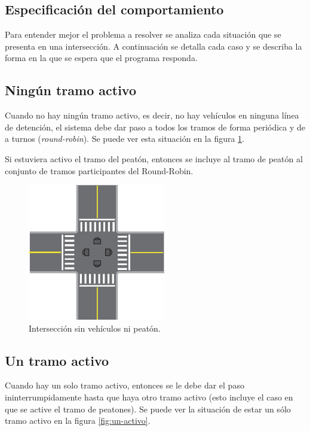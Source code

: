	\subsection{Especificación del comportamiento}\label{sec:spec}

		Para entender mejor el problema a resolver se analiza cada situación que se presenta en una intersección.
		A continuación se detalla cada caso y se describa la forma en la que se espera que el programa responda.



	\subsection{Ningún tramo activo}

		Cuando no hay ningún tramo activo, es decir, no hay vehículos en ninguna línea de detención, el sistema debe dar paso a todos los tramos de forma periódica y de a turnos (\emph{round-robin}).
		Se puede ver esta situación en la figura \ref{fig:ningun-activo}.

		Si estuviera activo el tramo del peatón, entonces se incluye al tramo de peatón al conjunto de tramos participantes del Round-Robin.

		\begin{figure}[htbp]
			\centering
			\includegraphics[width=6cm]{imagenes/ningun-activo.eps}
			\caption{Intersección sin vehículos ni peatón.}
			\label{fig:ningun-activo}
		\end{figure}



	\subsection{Un tramo activo}

		Cuando hay un solo tramo activo, entonces se le debe dar el paso ininterrumpidamente hasta que haya otro tramo activo (esto incluye el caso en que se active el tramo de peatones).
		Se puede ver la situación de estar un sólo tramo activo en la figura \ref{fig:un-activo}.

